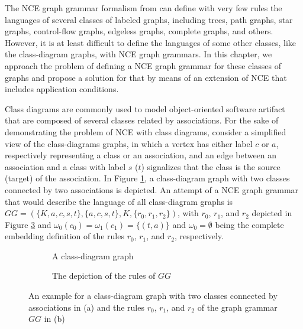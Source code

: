 
The NCE graph grammar formalism from \cite{janssens1982graph} can define with very few rules the languages of several classes of labeled graphs, including trees, path graphs, star graphs, control-flow graphs, edgeless graphs, complete graphs, and others. However, it is at least difficult to define the languages of some other classes, like the class-diagram graphs, with NCE graph grammars. In this chapter, we approach the problem of defining a NCE graph grammar for these classes of graphs and propose a solution for that by means of an extension of NCE that includes application conditions.

Class diagrams are commonly used to model object-oriented software artifact that are composed of several classes related by associations. For the sake of demonstrating the problem of NCE with class diagrams, consider a simplified view of the class-diagrams graphs, in which a vertex has either label $c$ or $a$, respectively representing a class or an association, and an edge between an association and a class with label $s$ ($t$) signalizes that the class is the source (target) of the association. In Figure \ref{fig:classdiagram-g}, a class-diagram graph with two classes connected by two associations is depicted. An attempt of a NCE graph grammar that would describe the language of all class-diagram graphs is $GG = (\{K,a,c,s,t\}, \{a,c,s,t\}, K, \{r_0, r_1, r_2\})$, with $r_0$, $r_1$, and $r_2$ depicted in Figure \ref{fig:classdiagram-gg} and $\omega_0(c_0) = \omega_1(c_1) = \{(t,a)\}$ and $\omega_0 = \emptyset$ being the complete embedding definition of the rules $r_0$, $r_1$, and $r_2$, respectively.

\begin{figure}[h]
	\begin{subfigure}[t]{0.5\textwidth}
		\centering
		
		\caption{A class-diagram graph}
		\label{fig:classdiagram-g}
	\end{subfigure}
	\begin{subfigure}[t]{0.49\textwidth}
		\centering
		
		\caption{The depiction of the rules of $GG$}
		\label{fig:classdiagram-gg}
	\end{subfigure}
	\caption{An example for a class-diagram graph with two classes connected by associations in (a) and the rules $r_0$, $r_1$, and $r_2$ of the graph grammar $GG$ in (b)}
\end{figure}

